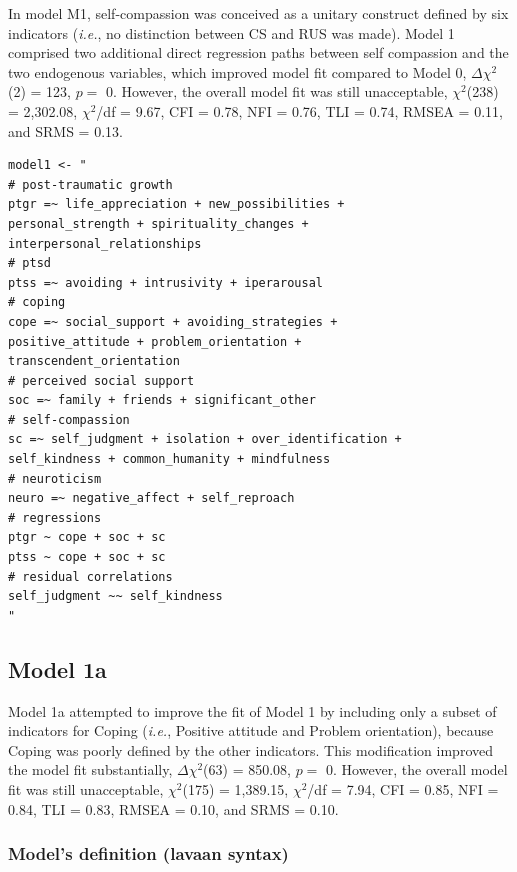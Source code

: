 \documentclass[
  english,
  man,floatsintext]{apa7}
\begin{document}
\begin{appendix}
In model M1, self-compassion was conceived as a unitary construct
defined by six indicators (\emph{i.e.}, no distinction between CS and
RUS was made). Model 1 comprised two additional direct regression paths
between self compassion and the two endogenous variables, which improved
model fit compared to Model 0, \(\Delta \chi^2\)(2) = 123, \(p =\) 0.
However, the overall model fit was still unacceptable, \(\chi^2\)(238) =
2,302.08, \(\chi^2\)/df = 9.67, CFI = 0.78, NFI = 0.76, TLI = 0.74,
RMSEA = 0.11, and SRMS = 0.13.

\begin{verbatim}
model1 <- "
# post-traumatic growth
ptgr =~ life_appreciation + new_possibilities + 
personal_strength + spirituality_changes + 
interpersonal_relationships
# ptsd
ptss =~ avoiding + intrusivity + iperarousal
# coping
cope =~ social_support + avoiding_strategies + 
positive_attitude + problem_orientation + 
transcendent_orientation
# perceived social support
soc =~ family + friends + significant_other
# self-compassion
sc =~ self_judgment + isolation + over_identification +
self_kindness + common_humanity + mindfulness
# neuroticism
neuro =~ negative_affect + self_reproach
# regressions
ptgr ~ cope + soc + sc 
ptss ~ cope + soc + sc 
# residual correlations
self_judgment ~~ self_kindness
"
\end{verbatim}

\newpage

\hypertarget{model-1a}{%
\subsection{Model 1a}\label{model-1a}}

Model 1a attempted to improve the fit of Model 1 by including only a
subset of indicators for Coping (\emph{i.e.}, Positive attitude and
Problem orientation), because Coping was poorly defined by the other
indicators. This modification improved the model fit substantially,
\(\Delta \chi^2\)(63) = 850.08, \(p =\) 0. However, the overall model
fit was still unacceptable, \(\chi^2\)(175) = 1,389.15, \(\chi^2\)/df =
7.94, CFI = 0.85, NFI = 0.84, TLI = 0.83, RMSEA = 0.10, and SRMS = 0.10.

\hypertarget{models-definition-lavaan-syntax-2}{%
\subsubsection{Model's definition (lavaan
syntax)}\label{models-definition-lavaan-syntax-2}}


\end{appendix}
\end{document}
